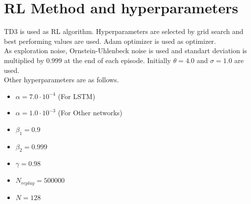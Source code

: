 \section{RL Method and hyperparameters}
TD3 is used as RL algorithm. Hyperparameters are selected by grid search and best performing values are used. Adam optimizer is used as optimizer. \\
As exploration noise, Ornstein-Uhlenbeck noise is used and standart deviation is multiplied  by $0.999$ at the end of each episode. Initially $\theta=4.0$ and $\sigma=1.0$ are used. \\
Other hyperparameters are as follows. \\
\begin{itemize}
	\item $\alpha=7.0 \cdot 10^{-4}$ (For LSTM)
	\item $\alpha=1.0 \cdot 10^{-3}$ (For Other networks)
	\item $\beta_1=0.9$
	\item $\beta_2=0.999$
	\item $\gamma=0.98$
	\item $N_{replay} = 500000$
	\item $N = 128$
\end{itemize}
%
